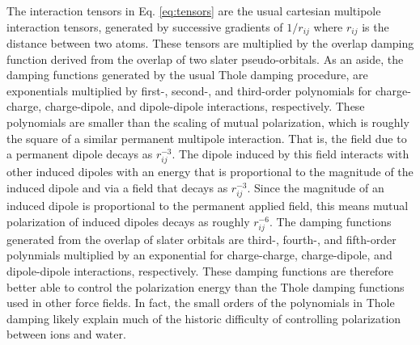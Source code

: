 \documentclass[journal=jacsat,manuscript=article]{achemso}
\begin{document}
The interaction tensors in Eq. \ref{eq:tensors} are the usual cartesian multipole interaction
tensors, generated by successive gradients of $1/r_{ij}$ where $r_{ij}$ is the distance between
two atoms. These tensors are multiplied by the overlap damping function derived from the overlap
of two slater pseudo-orbitals\cite{rackers2021polarizable}.
As an aside, the damping functions generated by the usual Thole damping procedure\cite{thole1981molecular},
are exponentials multiplied by first-, second-, and third-order polynomials
for charge-charge, charge-dipole, and dipole-dipole interactions, respectively.\cite{thole1981molecular}
These polynomials are smaller than the scaling of mutual polarization, which is roughly the square
of a similar permanent multipole interaction. That is, the field due to a permanent dipole
decays as $r_{ij}^{-3}$. The dipole induced by this field interacts with other induced dipoles
with an energy that is proportional to the magnitude of the induced dipole and via a field
that decays as $r_{ij}^{-3}$. Since the magnitude of an induced dipole is proportional to
the permanent applied field, this means mutual polarization of induced dipoles decays as roughly $r_{ij}^{-6}$.
The damping functions generated from the overlap of slater orbitals are
third-, fourth-, and fifth-order polynmials multiplied by an exponential for charge-charge, charge-dipole,
and dipole-dipole interactions, respectively. These damping functions are therefore better able
to control the polarization energy than the Thole damping functions used in other force fields.
In fact, the small orders of the polynomials in Thole damping likely explain much of the historic difficulty of controlling
polarization between ions and water.\cite{jiao2006simulation,mason2012accurate}
\end{document}
